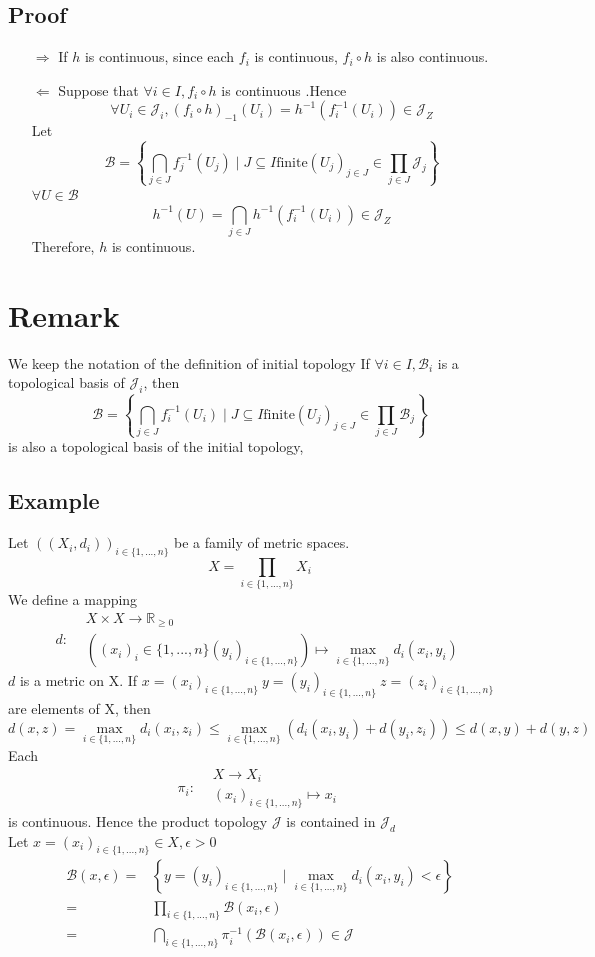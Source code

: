 \documentclass{book}
\begin{document}
\subsection{Proof}
\begin{itemize}
    \item [$\Rightarrow$]If $h$ is continuous, since each $f_i$ is continuous, $f_i\circ h$ is also continuous.
    \item [$\Leftarrow$]Suppose that $\forall i\in I, f_i\circ h$ is continuous .Hence $$\forall U_i\in \mathcal{J}_i,(f_i\circ h)_{-1}(U_i)=h^{-1}(f_i^{-1}(U_i))\in \mathcal{J}_Z$$ Let $$\mathscr{B}=\left\{\bigcap\limits_{j\in J}f_j^{-1}(U_j)\mid J\subseteq I\text{finite} (U_j)_{j\in J}\in \prod\limits_{j\in J}\mathcal{J}_j\right\}$$$\forall U\in \mathscr{B}$$$h^{-1}(U)=\bigcap\limits_{j\in J}h^{-1}(f_i^{-1}(U_i))\in \mathcal{J}_Z$$Therefore, $h$ is continuous.
\end{itemize}
\section{Remark}
We keep the notation of the definition of initial topology If $\forall i\in I,\mathscr{B}_i$ is a topological basis of $\mathcal{J}_i$, then $$\mathscr{B}=\left\{\bigcap\limits_{j\in J}f_i^{-1}(U_i)\mid J\subseteq I \text{finite} (U_j)_{j\in J}\in \prod\limits_{j\in J}\mathscr{B}_j\right\}$$ is also a topological basis of the initial topology,
\subsection{Example}
Let $((X_i,d_i))_{i\in \{1,...,n\}}$ be a family of metric spaces.$$X=\prod\limits_{i\in \{1,...,n\}}X_i$$ We define a mapping $$d:\begin{aligned}
&X\times X\rightarrow \mathbb{R}_{\geq 0}\\
&((x_i)_i\in \{1,...,n\}(y_i)_{i\in \{1,...,n\}})\mapsto\max\limits_{i\in \{1,...,n\}} d_i(x_i,y_i)
\end{aligned}$$
$d$ is a metric on X. If $x=(x_i)_{i\in \{1,...,n\}}\ y=(y_i)_{i\in \{1,...,n\}}\ z=(z_i)_{i\in \{1,...,n\}}$ are elements of X, then $$d(x,z)=\max\limits_{i\in \{1,...,n\}}d_i(x_i,z_i)\leq\max\limits_{i\in \{1,...,n\}}\left(d_i(x_i,y_i)+d(y_i,z_i)\right)\leq d(x,y)+d(y,z)$$
Each$$\pi_i:\begin{aligned}
    &X\rightarrow X_i\\ &(x_i)_{i\in \{1,...,n\}}\mapsto x_i
\end{aligned}$$ is continuous.
Hence the product topology $\mathcal{J}$ is contained in $\mathcal{J}_d$\\Let $x=(x_i)_{i\in \{1,...,n\}}\in X,\epsilon>0$
$$
\begin{aligned}
\mathcal{B}(x,\epsilon)=&\left\{ y=(y_i)_{i\in \{1,...,n\}}\mid\max\limits_{i\in \{1,...,n\}}d_i(x_i,y_i)<\epsilon\right\}\\ =&\prod\limits_{i\in \{1,...,n\}}\mathcal{B}(x_i,\epsilon)\\=&\bigcap\limits_{i\in \{1,...,n\}}\pi_i^{-1}(\mathcal{B}(x_i,\epsilon))\in \mathcal{J}
\end{aligned}$$
\end{document}
